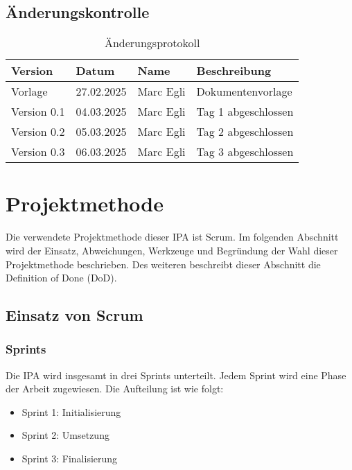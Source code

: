 \section{Änderungskontrolle}
\begin{table}[h!]
    \begin{tabular}{|L{0.2\textwidth}|L{0.2\textwidth}|L{0.2\textwidth}|L{0.3\textwidth}|}
        \color{white}Version & \color{white} Datum & \color{white} Name & \color{white} Beschreibung \\
        \hline
        Vorlage & 27.02.2025 &  Marc Egli & Dokumentenvorlage \\
        \hline
        Version 0.1 & 04.03.2025 &  Marc Egli & Tag 1 abgeschlossen \\
        \hline
        Version 0.2 & 05.03.2025 &  Marc Egli & Tag 2 abgeschlossen \\
        \hline
        Version 0.3 & 06.03.2025 &  Marc Egli & Tag 3 abgeschlossen \\
        \hline
      \end{tabular}
      \caption{Änderungsprotokoll}
 \end{table}

\chapter{Projektmethode}
Die verwendete Projektmethode dieser IPA ist Scrum. Im folgenden Abschnitt wird der Einsatz, Abweichungen, Werkzeuge und Begründung der Wahl
dieser Projektmethode beschrieben. Des weiteren beschreibt dieser Abschnitt die Definition of Done (DoD).

\section{Einsatz von Scrum}

\subsection{Sprints}
Die IPA wird insgesamt in drei Sprints unterteilt. Jedem Sprint wird eine Phase der Arbeit zugewiesen. Die Aufteilung ist wie folgt:

\begin{itemize}
    \item Sprint 1: Initialisierung
    \item Sprint 2: Umsetzung
    \item Sprint 3: Finalisierung
\end{itemize}

